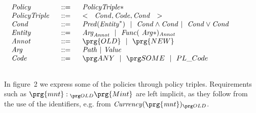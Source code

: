 
$
\begin{array}{c}
\begin{array}{lcl}
\\
\it{Policy} & \ \  ::= \ \  & \it{PolicyTriple}*
\\
 \it{PolicyTriple}  & ::= & < \ \ \it{Cond}, \it{Code}, \it{Cond} \ \ > \\
 \it{Cond} & ::= &         \it{Pred}( \it{Entity}^*)  \ \  | \ \   \it{Cond}  \wedge  \it{Cond}    \  | \ \   \it{Cond}  \vee  \it{Cond}
 \\
  \it{Entity} & ::= &  \it{Arg}_{\it Annot} \ \     | \ \   \it{Func}( \ \it{Arg}*)_{\it Annot}
  \\
  {\it Annot} & ::= & \prg{OLD} \ \     | \ \ \prg{NEW}
    \\
    \it{Arg} & ::= &  \it{Path}\ |\  \it{Value}
\\
\it{Code} & \ \  ::= \ \  & \any \ \  | \ \  \some \ \  | \ \  {PL\_Code}
\\
\\
\end{array}
\end{array}
$



In figure~2 we express some of  the   policies through policy triples. Requirements such as $\prg{mnt}:\old \prg{Mint}$
are left   implicit, as they follow  from the use of the  identifiers, e.g. from ${\it Currency(\prg{mnt})}\old$.

